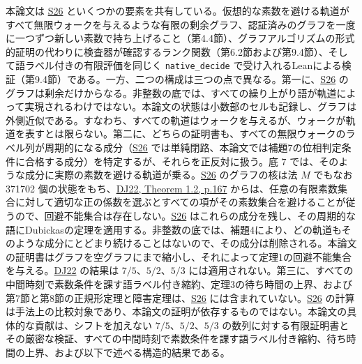 \documentclass[11pt,reqno]{amsart}
\theoremstyle{definition}
\theoremstyle{definition}
\theoremstyle{remark}
\begin{document}
本論文は \hyperref[ref-s26]{S26} といくつかの要素を共有している。仮想的な素数を避ける軌道がすべて無限ウォークを与えるような有限の剰余グラフ、認証済みのグラフを一度に一つずつ新しい素数で持ち上げること（第4.4節）、グラフアルゴリズムの形式的証明の代わりに検査器が確認するランク関数（第6.2節および第9.4節）、そして語ラベル付きの有限評価を同じく \nolinkurl{native_decide} で受け入れるLeanによる検証（第9.4節）である。一方、二つの構成は三つの点で異なる。第一に、\hyperref[ref-s26]{S26} のグラフは剰余だけからなる。非整数の底では、すべての繰り上がり語が軌道によって実現されるわけではない。本論文の状態は小数部のセルも記録し、グラフは外側近似である。すなわち、すべての軌道はウォークを与えるが、ウォークが軌道を表すとは限らない。第二に、どちらの証明書も、すべての無限ウォークのラベル列が周期的になる成分（\hyperref[ref-s26]{S26} では単純閉路、本論文では補題7の位相判定条件に合格する成分）を特定するが、それらを正反対に扱う。底 \(7\) では、そのような成分に実際の素数を避ける軌道が乗る。\hyperref[ref-s26]{S26} のグラフの核は法 \(M\) でもなお 371702 個の状態をもち、\hyperref[ref-dj22]{DJ22, Theorem 1.2, p.167} からは、任意の有限素数集合に対して適切な正の係数を選ぶとすべての項がその素数集合を避けることが従うので、回避不能集合は存在しない。\hyperref[ref-s26]{S26} はこれらの成分を残し、その周期的な語にDubickasの定理を適用する。非整数の底では、補題4により、どの軌道もそのような成分にとどまり続けることはないので、その成分は削除される。本論文の証明書はグラフを空グラフにまで縮小し、それによって定理1の回避不能集合を与える。\hyperref[ref-dj22]{DJ22} の結果は \(7/5\)、\(5/2\)、\(5/3\) には適用されない。第三に、すべての中間時刻で素数条件を課す語ラベル付き縮約、定理3の待ち時間の上界、および第7節と第8節の正規形定理と障害定理は、\hyperref[ref-s26]{S26} には含まれていない。\hyperref[ref-s26]{S26} の計算は手法上の比較対象であり、本論文の証明が依存するものではない。本論文の具体的な貢献は、シフトを加えない \(7/5\)、\(5/2\)、\(5/3\) の数列に対する有限証明書とその厳密な検証、すべての中間時刻で素数条件を課す語ラベル付き縮約、待ち時間の上界、および以下で述べる構造的結果である。
\end{document}
